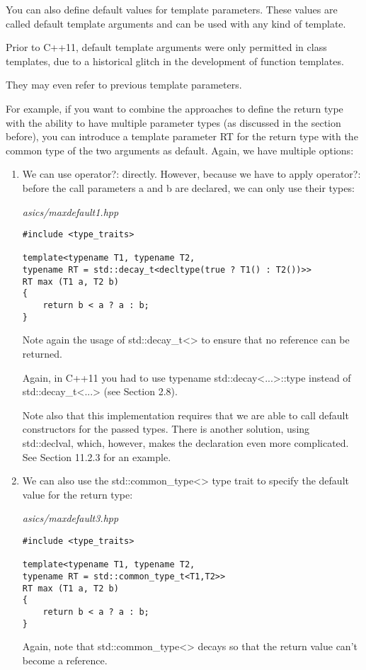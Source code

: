 You can also define default values for template parameters. These values are called default template arguments and can be used with any kind of template.

\begin{tcolorbox}[colback=webgreen!5!white,colframe=webgreen!75!black]
\hspace*{0.75cm}Prior to C++11, default template arguments were only permitted in class templates, due to a historical glitch in the development of function templates.
\end{tcolorbox}

They may even refer to previous template parameters.

For example, if you want to combine the approaches to define the return type with the ability to have multiple parameter types (as discussed in the section before), you can introduce a template parameter RT for the return type with the common type of the two arguments as default. Again, we have multiple options:


\begin{enumerate}
\item 
We can use operator?: directly. However, because we have to apply operator?: before the call parameters a and b are declared, we can only use their types:

\noindent
\textit{asics/maxdefault1.hpp}
\begin{lstlisting}[style=styleCXX]
#include <type_traits>

template<typename T1, typename T2,
typename RT = std::decay_t<decltype(true ? T1() : T2())>>
RT max (T1 a, T2 b)
{
	return b < a ? a : b;
}
\end{lstlisting}

Note again the usage of std::decay\_t<> to ensure that no reference can be returned.

\begin{tcolorbox}[colback=webgreen!5!white,colframe=webgreen!75!black]
\hspace*{0.75cm}Again, in C++11 you had to use typename std::decay<...>::type instead of std::decay\_t<...> (see Section 2.8).
\end{tcolorbox}

Note also that this implementation requires that we are able to call default constructors for the passed types. There is another solution, using std::declval, which, however, makes the declaration even more complicated. See Section 11.2.3 for an example.

\item
We can also use the std::common\_type<> type trait to specify the default value for the return type: 

\noindent
\textit{asics/maxdefault3.hpp}
\begin{lstlisting}[style=styleCXX]
#include <type_traits>

template<typename T1, typename T2,
typename RT = std::common_type_t<T1,T2>>
RT max (T1 a, T2 b)
{
	return b < a ? a : b;
}
\end{lstlisting}

Again, note that std::common\_type<> decays so that the return value can’t become a reference.
\end{enumerate}

